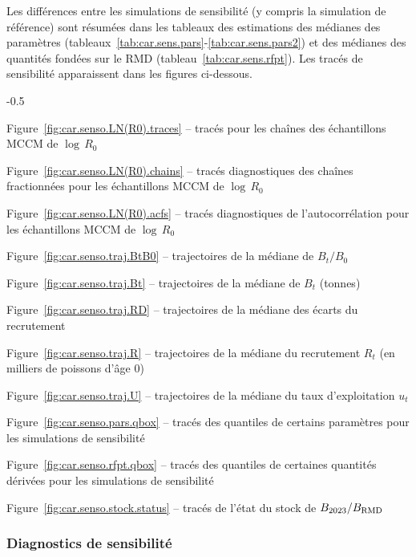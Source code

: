 \documentclass[11pt]{book}
\newcommand{\Bmsy}{B_\text{RMD}}
\begin{document}
Les diff\'{e}rences entre les simulations de sensibilit\'{e} (y compris la simulation de r\'{e}f\'{e}rence) sont r\'{e}sum\'{e}es dans les tableaux des estimations des m\'{e}dianes des param\`{e}tres (tableaux~\ref{tab:car.sens.pars}-\ref{tab:car.sens.pars2}) et des m\'{e}dianes des quantit\'{e}s fond\'{e}es sur le RMD (tableau~\ref{tab:car.sens.rfpt}).
Les trac\'{e}s de sensibilit\'{e} apparaissent dans les figures ci-dessous.
\begin{itemize_csas}{-0.5}{}
  \item Figure~\ref{fig:car.senso.LN(R0).traces} -- trac\'{e}s pour les cha\^{i}nes des \'{e}chantillons MCCM de $\log\,R_0$
  \item Figure~\ref{fig:car.senso.LN(R0).chains} -- trac\'{e}s diagnostiques des cha\^{i}nes fractionn\'{e}es pour les \'{e}chantillons MCCM de $\log\,R_0$
  \item Figure~\ref{fig:car.senso.LN(R0).acfs} -- trac\'{e}s diagnostiques de l'autocorr\'{e}lation pour les \'{e}chantillons MCCM de $\log\,R_0$
  \item Figure~\ref{fig:car.senso.traj.BtB0} -- trajectoires de la m\'{e}diane de $B_t/B_0$
  \item Figure~\ref{fig:car.senso.traj.Bt} -- trajectoires de la m\'{e}diane de $B_t$ (tonnes)
  \item Figure~\ref{fig:car.senso.traj.RD} -- trajectoires de la m\'{e}diane des \'{e}carts du recrutement
  \item Figure~\ref{fig:car.senso.traj.R} -- trajectoires de la m\'{e}diane du recrutement $R_t$ (en milliers de poissons d'\^{a}ge 0)
  \item Figure~\ref{fig:car.senso.traj.U} -- trajectoires de la m\'{e}diane du taux d'exploitation $u_t$
  \item Figure~\ref{fig:car.senso.pars.qbox} -- trac\'{e}s des quantiles de certains param\`{e}tres pour les simulations de sensibilit\'{e}
  \item Figure~\ref{fig:car.senso.rfpt.qbox} -- trac\'{e}s des quantiles de certaines quantit\'{e}s d\'{e}riv\'{e}es pour les simulations de sensibilit\'{e}
  \item Figure~\ref{fig:car.senso.stock.status} -- trac\'{e}s de l'\'{e}tat du stock de $B_{\currYear}/\Bmsy$
 \end{itemize_csas}

\subsubsection{Diagnostics de sensibilit\'{e}}
\end{document}
